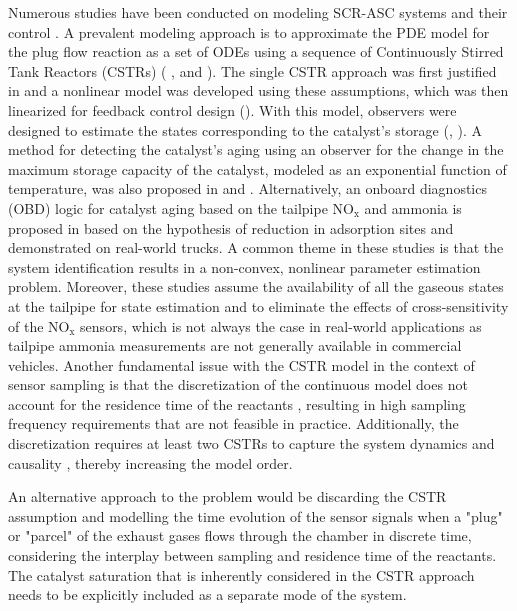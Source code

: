 \documentclass[subscriptcorrection,upint,varvw,barcolor=Goldenrod3,mathalfa=cal=euler,balance,hyphenate,french,pdf-a]{asmejour}
\newcommand{\nox}{\text{NO}_{\text{x}}}
\begin{document}
Numerous studies have been conducted on modeling SCR-ASC systems and their control \cite{yuan2015diesel}. A prevalent
modeling approach is to approximate the PDE model for the plug flow reaction as a set of ODEs using a sequence of
Continuously Stirred Tank Reactors (CSTRs) (\cite{hsieh2011development} , and \cite{nova2014urea}). The
single CSTR approach was first justified in \cite{devarakonda2008adequacy} and a nonlinear model was developed using
these assumptions, which was then linearized for feedback control design (\cite{devarakonda2009model}). With this model,
observers were designed to estimate the states corresponding to the catalyst's storage (\cite{ma2017observer},
\cite{jain2020term}). A method for detecting the catalyst's aging using an observer for the change in the maximum
storage capacity of the catalyst, modeled as an exponential function of temperature, was also proposed in
\cite{ma2017observer} and \cite{jiang2019hydrothermal}. Alternatively, an onboard diagnostics (OBD) logic for catalyst
aging based on the tailpipe $\nox$ and ammonia is proposed in \cite{matsumoto2016model} based on the hypothesis of
reduction in adsorption sites and demonstrated on real-world trucks. A common theme in these studies is that the system
identification results in a non-convex, nonlinear parameter estimation problem. Moreover, these studies assume the
availability of all the gaseous states at the tailpipe for state estimation and to eliminate the effects of
cross-sensitivity of the $\nox$ sensors, which is not always the case in real-world applications as tailpipe ammonia
measurements are not generally available in commercial vehicles. Another fundamental issue with the CSTR model in the
context of sensor sampling is that the discretization of the continuous model does not account for the residence time
of the reactants \cite{charla2026board}, resulting in high sampling frequency requirements that are not feasible in
practice. Additionally, the discretization requires at least two CSTRs to capture the system dynamics and causality
\cite{charla2024reduced}, thereby increasing the model order.

An alternative approach to the problem would be discarding the CSTR assumption and modelling the time evolution of the
sensor signals when a "plug" or "parcel" of the exhaust gases flows through the chamber in discrete time, considering
the interplay between sampling and residence time of the reactants. The catalyst saturation that is inherently
considered in the CSTR approach needs to be explicitly included as a separate mode of the system.
\end{document}
